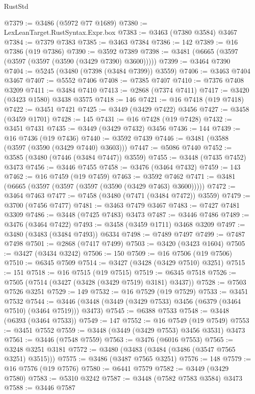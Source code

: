 \begin{lexlean}{RustStd}
\begin{coremodule}
{\begin{coremodule}
{{{{{{{{{{{{{{{{{{{{{{{{{{{{{{{{{{{{{{{{{{{{{{{{{{{{{{{{{{{{{{{{{{{{{{{{{{{{{{{{{{{{{@7379 := @3486 (@5972 @77 @1689)
@7380 := LexLeanTarget.RustSyntax.Expr.box
@7383 := @3463 (@7380 @3584) @3467
@7384 := @7379 @7383
@7385 := @3463 @7384
@7386 := 142
@7389 := @16 @7386 (@19 @7386)
@7390 := @3592 @7389
@7398 := @3481 (@6665 (@3597 (@3597 (@3597 (@3590 (@3429 @7390) @3600)))))
@7399 := @3464 @7390
@7404 := @5245 (@3480 (@7398 (@3484 @7399)) @3559)
@7406 := @3463 @7404 @3467
@7407 := @5552 @7406
@7408 := @7385 @7407
@7410 := @7376 @7408 @3209
@7411 := @3484 @7410
@7413 := @2868 (@7374 @7411)
@7417 := @3420 (@3423 @1580) @3438 @3575
@7418 := 146
@7421 := @16 @7418 (@19 @7418)
@7422 := @3451 @7421
@7425 := @3449 (@3429 @7422) @3456
@7427 := @3458 (@3459 @1701)
@7428 := 145
@7431 := @16 @7428 (@19 @7428)
@7432 := @3451 @7431
@7435 := @3449 (@3429 @7432) @3456
@7436 := 144
@7439 := @16 @7436 (@19 @7436)
@7440 := @3592 @7439
@7446 := @3481 (@3588 (@3597 (@3590 (@3429 @7440) @3603)))
@7447 := @5086 @7440
@7452 := @3585 (@3480 (@7446 (@3484 @7447)) @3559)
@7455 := @3448 (@7435 @7452) @3473
@7456 := @3446 @7455
@7458 := @3476 (@3464 @7432)
@7459 := 143
@7462 := @16 @7459 (@19 @7459)
@7463 := @3592 @7462
@7471 := @3481 (@6665 (@3597 (@3597 (@3597 (@3590 (@3429 @7463) @3600)))))
@7472 := @3464 @7463
@7477 := @7458 (@3480 (@7471 (@3484 @7472)) @3559)
@7479 := @3700 (@7456 @7477)
@7481 := @3463 @7479 @3467
@7483 := @7427 @7481 @3309
@7486 := @3448 (@7425 @7483) @3473
@7487 := @3446 @7486
@7489 := @3476 (@3464 @7422)
@7493 := @3458 (@3459 @1711) @3468 @3209
@7497 := @3480 (@3483 (@3484 @7493)) @6334
@7498 := @7489 @7497
@7499 := @7487 @7498
@7501 := @2868 (@7417 @7499)
@7503 := @3420 (@3423 @1604)
@7505 := @3427 (@3434 @3242)
@7506 := 150
@7509 := @16 @7506 (@19 @7506)
@7510 := @6345 @7509
@7514 := @3427 (@3428 (@3429 @7510) @3251)
@7515 := 151
@7518 := @16 @7515 (@19 @7515)
@7519 := @6345 @7518
@7526 := @7505 (@7514 (@3427 (@3428 (@3429 @7519) @3181) @3437))
@7528 := @7503 @7526 @3251
@7529 := 149
@7532 := @16 @7529 (@19 @7529)
@7533 := @3451 @7532
@7544 := @3446 (@3448 (@3449 (@3429 @7533) @3456 (@6379 (@3464 @7510) (@3464 @7519))) @3473)
@7545 := @6388 @7533
@7548 := @3448 (@6393 (@3464 @7533))
@7549 := 147
@7552 := @16 @7549 (@19 @7549)
@7553 := @3451 @7552
@7559 := @3448 (@3449 (@3429 @7553) @3456 @3531) @3473
@7561 := @3446 (@7548 @7559)
@7563 := @3476 (@6016 @7553)
@7565 := @3248 @3251 @3181
@7572 := @3480 (@3483 (@3484 (@3486 (@3547 @7565 @3251) @3515)))
@7575 := @3486 (@3487 @7565 @3251)
@7576 := 148
@7579 := @16 @7576 (@19 @7576)
@7580 := @6441 @7579
@7582 := @3449 (@3429 @7580)
@7583 := @5310 @3242
@7587 := @3448 (@7582 @7583 @3584) @3473
@7588 := @3446 @7587
}}}}}}}}}}}}}}}}}}}}}}}}}}}}}}}}}}}}}}}}}}}}}}}}}}}}}}}}}}}}}}}}}}}}}}}}}}}}}}}}}}}}}
\end{coremodule}}
\end{coremodule}
\end{lexlean}
